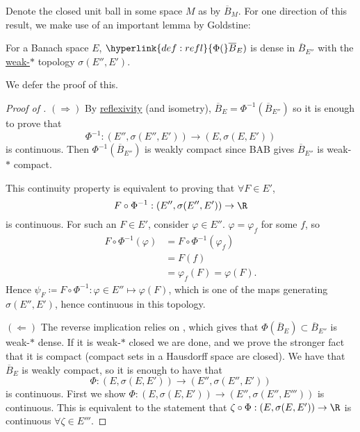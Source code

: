 \documentclass[twoside]{article}
\begin{document}
Denote the closed unit ball in some space $M$ as by $\overline{B}_M$.
For one direction of this result, we make use of an important lemma by Goldstine:
\begin{lemma}\label{lem:goldstine}
  For a Banach space $E$, $\hyperlink{def:refl}{\Phi(}\overline{B}_E)$ is dense in $\overline{B}_{E''}$ with the \hyperlink{def:weakStar}{weak-$*$} topology $\sigma(E'', E')$.
\end{lemma}
We defer the proof of this.
\begin{proof}[Proof of ]
    $(\Rightarrow)$ By \hyperlink{def:refl}{reflexivity} (and isometry), $\overline{B}_E=\Phi^{-1}(\overline{B}_{E''})$ so it is enough to prove that
    \begin{equation*}
        \Phi^{-1}: (E'', \sigma(E'', E')) \longrightarrow (E, \sigma(E, E'))
    \end{equation*}
    is continuous.
    Then $\Phi^{-1}(\overline{B}_{E''})$ is weakly compact since BAB gives $\overline{B}_{E''}$ is weak-$*$ compact.

    This continuity property is equivalent to proving that $\forall F \in E'$,
    \begin{equation*}
        F \circ \Phi^{-1}: (E'', \sigma(E'', E')) \to \R
    \end{equation*}
    is continuous.
    For such an $F \in E'$, consider $\varphi \in E''$. $\varphi = \varphi_f$ for some $f$, so
    \begin{align*}
        F \circ \Phi^{-1} (\varphi) &= F \circ \Phi^{-1} (\varphi_f) \\ %
                                 &= F(f) \\
                                 &=\varphi_f(F) = \varphi(F).
    \end{align*}
    Hence $\psi_F \coloneqq F \circ \Phi^{-1}: \varphi \in E'' \mapsto \varphi(F)$, which is one of the maps generating $\sigma(E'', E')$, hence continuous in this topology.

    $(\Leftarrow)$ The reverse implication relies on , which gives that $\Phi(\overline{B}_E) \subset \overline{B}_{E''}$ is weak-$*$ dense.
    If it is weak-$*$ closed we are done, and we prove the stronger fact that it is compact (compact sets in a Hausdorff space are closed).
    We have that $\overline{B}_E$ is weakly compact, so it is enough to have that
    \begin{equation*}
        \Phi: (E, \sigma(E, E')) \longrightarrow (E'', \sigma(E'', E'))
    \end{equation*}
    is continuous. First we show $\Phi: (E, \sigma(E, E')) \to (E'', \sigma(E'', E'''))$ is continuous.
    This is equivalent to the statement that $\zeta \circ \Phi: (E, \sigma(E, E')) \to \R$ is continuous $\forall \zeta \in E'''$.


\end{proof}
\end{document}
